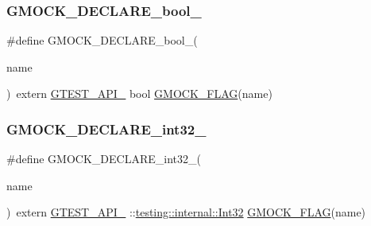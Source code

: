\subsubsection{\texorpdfstring{GMOCK\_DECLARE\_bool\_}{GMOCK\_DECLARE\_bool\_}}
{\footnotesize\ttfamily \#define G\+M\+O\+C\+K\+\_\+\+D\+E\+C\+L\+A\+R\+E\+\_\+bool\+\_\+(\begin{DoxyParamCaption}\item[{}]{name }\end{DoxyParamCaption})~extern \mbox{\hyperlink{_obj__test_2lib_2googletest-release-1_88_81_2googletest_2include_2gtest_2internal_2gtest-port_8h_aa73be6f0ba4a7456180a94904ce17790}{G\+T\+E\+S\+T\+\_\+\+A\+P\+I\+\_\+}} bool \mbox{\hyperlink{_obj__test_2lib_2googletest-release-1_88_81_2googlemock_2include_2gmock_2internal_2gmock-port_8h_ad7119adfef06be5e7b1551633f5a1436}{G\+M\+O\+C\+K\+\_\+\+F\+L\+AG}}(name)}

\mbox{\label{_obj__test_2lib_2googletest-release-1_88_81_2googlemock_2include_2gmock_2internal_2gmock-port_8h_adeb7f0a8d842d1d541615763835af3f9}} 
\subsubsection{\texorpdfstring{GMOCK\_DECLARE\_int32\_}{GMOCK\_DECLARE\_int32\_}}
{\footnotesize\ttfamily \#define G\+M\+O\+C\+K\+\_\+\+D\+E\+C\+L\+A\+R\+E\+\_\+int32\+\_\+(\begin{DoxyParamCaption}\item[{}]{name }\end{DoxyParamCaption})~extern \mbox{\hyperlink{_obj__test_2lib_2googletest-release-1_88_81_2googletest_2include_2gtest_2internal_2gtest-port_8h_aa73be6f0ba4a7456180a94904ce17790}{G\+T\+E\+S\+T\+\_\+\+A\+P\+I\+\_\+}} \+::\mbox{\hyperlink{namespacetesting_1_1internal_af89e21e4043b5cf0c120af487b24fa06}{testing\+::internal\+::\+Int32}} \mbox{\hyperlink{_obj__test_2lib_2googletest-release-1_88_81_2googlemock_2include_2gmock_2internal_2gmock-port_8h_ad7119adfef06be5e7b1551633f5a1436}{G\+M\+O\+C\+K\+\_\+\+F\+L\+AG}}(name)}

\mbox{\label{_obj__test_2lib_2googletest-release-1_88_81_2googlemock_2include_2gmock_2internal_2gmock-port_8h_a35af08c45131cf68d78446cb8cfe40fe}} 
